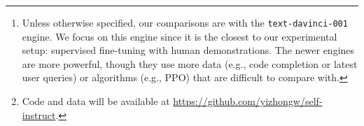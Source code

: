 \documentclass[11pt]{article}
\newcommand{\daniel}[1]{\textcolor{blue}{[DK: #1]}}
\newcommand{\hanna}[1]{\textcolor{brown}{[HH: #1]}}
\newcommand{\nascomment}[1]{\textcolor{blue}{\textbf{[#1 -- \textsc{nas}]}}}
\newcommand{\alisa}[1]{\textcolor{purple}{\textbf{[#1 -- \textsc{al}]}}}
\newcommand{\name}{\textsc{Self-Instruct}}
\newcommand{\supernat}{\textsc{Super-NaturalInstructions}}
\newcommand{\gptthree}{\textsc{GPT3}}
\newcommand{\gptself}{\textsc{GPT3}$_{\textsc{Self-Inst}}$}
\newcommand{\gptinstruct}[1]{$\text{InstructGPT}_{\text{#1}}$}
\begin{document}
\begin{abstract}
Applying our method to vanilla \gptthree{}, we demonstrate a 33\% absolute improvement over the original model on \supernat{}, on par with the performance of \gptinstruct{001}\footnote{
\label{footnote:gpt:instruct}Unless otherwise specified, our comparisons are with the 
{\tt text-davinci-001} engine. 
We focus on this engine since it is the closest to our experimental setup: supervised fine-tuning with human demonstrations. 
The newer engines are more powerful, though they use more data (e.g., code completion or latest user queries) or algorithms (e.g., PPO) that are difficult to compare with. 
}, which is trained with private user data and human annotations.
For further evaluation, we curate a set of expert-written instructions for novel tasks, and show through human evaluation that tuning GPT3 with \name{} outperforms using existing public instruction datasets by a large margin, leaving only a 5\% absolute gap behind \gptinstruct{001}.
\name{} provides an almost annotation-free method for aligning pretrained language models with instructions, and we release our large synthetic dataset to facilitate future studies on instruction tuning\footnote{Code and data will be available at \url{https://github.com/yizhongw/self-instruct}.}.



\end{abstract}
\end{document}
